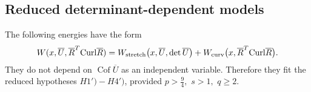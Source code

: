 \documentclass[11pt]{article}
\newcommand{\Curl}{{\rm Curl}}
\DeclareMathOperator{\Cof}{Cof}
\begin{document}
\subsection{Reduced determinant-dependent models}

The following energies have the form
\begin{align}
        W(x,\overline U, \overline R ^T\Curl \overline R )
        =
        W_{\rm stretch}\bigl(x,\overline U,\det \overline U\bigr)
        +
        W_{\rm curv}\bigl(x, \overline R ^T\Curl \overline R \bigr).
\end{align}
They do not depend on $\Cof \overline U$ as an independent variable. Therefore they fit
the reduced hypotheses $H1')-H4')$, provided
$
        p>\frac{9}{4},
           $ $
        s>1,
           $ $
        q\geq 2.
$
\end{document}
